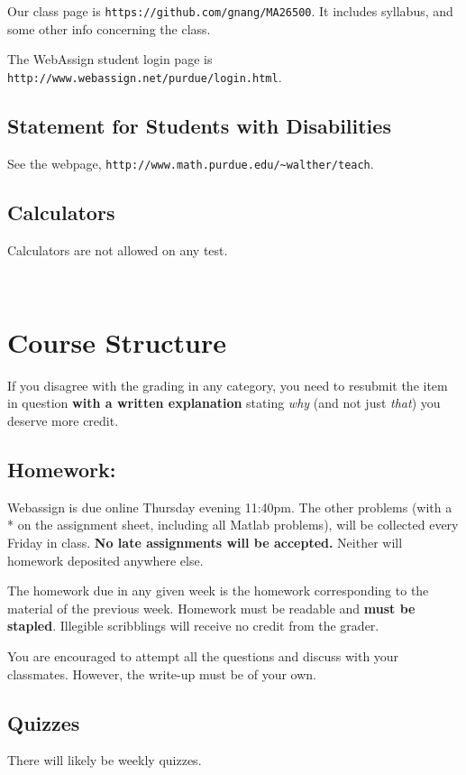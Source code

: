 \documentclass[10pt]{article}
\begin{document}
\noindent Our class page is {\tt https://github.com/gnang/MA26500}. It includes syllabus,
and some other info concerning the class. \smallskip

\noindent The WebAssign student login page is {\tt http://www.webassign.net/purdue/login.html}.

\subsection{Statement for Students with Disabilities}
See the webpage, {\tt http://www.math.purdue.edu/\~{}walther/teach}.

\subsection{Calculators}
Calculators are not allowed on any test.

\newpage 
~
\vspace{-3cm}
\section{Course Structure}

If you disagree with the grading in any category, you need to resubmit
the item in question {\bf with a written explanation} stating {\em why} (and
not just {\em that}) you deserve more credit. 
\subsection{Homework:}   
        Webassign is due online Thursday evening 11:40pm.  The
        other problems (with a * on the assignment sheet, including
        all Matlab problems), will be collected every Friday in
        class. {\bf No late assignments will be accepted.}  
        Neither will homework deposited anywhere else.

	The homework due in any given week is the
	homework corresponding to the material of the previous
	week. Homework must be readable and {\bf must be stapled}. Illegible
	scribblings will receive no credit from the grader.

        You are encouraged to attempt all the questions and discuss
        with your classmates. However, the write-up must
        be of your own.

\subsection{Quizzes}
There will likely be weekly quizzes.
\end{document}
